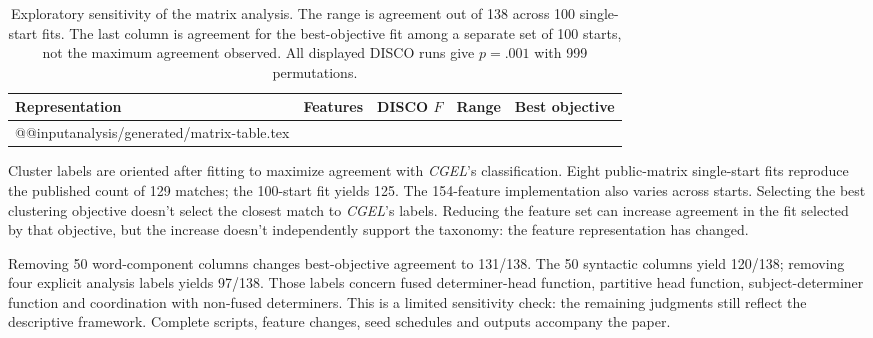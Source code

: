 \documentclass[12pt]{article}
\makeatletter
\newcommand{\tablebody}[1]{\csname @@input\endcsname #1 }
\makeatother
\begin{document}
\begin{table}[htbp]
\centering\small
\caption{Exploratory sensitivity of the matrix analysis. The range is agreement out of 138 across 100 single-start fits. The last column is agreement for the best-objective fit among a separate set of 100 starts, not the maximum agreement observed. All displayed DISCO runs give \mbox{$p=.001$} with 999 permutations.}\label{tab:matrix}
\begin{tabular}{>{\raggedright\arraybackslash}p{5.1cm}rrrr}
\toprule
Representation & Features & DISCO $F$ & Range & Best objective \\
\midrule
\tablebody{analysis/generated/matrix-table.tex}
\bottomrule
\end{tabular}
\end{table}

Cluster labels are oriented after fitting to maximize agreement with \textit{CGEL}'s classification. Eight public-matrix single-start fits reproduce the published count of 129 matches; the 100-start fit yields 125. The 154-feature implementation also varies across starts. Selecting the best clustering objective doesn't select the closest match to \textit{CGEL}'s labels. Reducing the feature set can increase agreement in the fit selected by that objective, but the increase doesn't independently support the taxonomy: the feature representation has changed.

Removing 50 word-component columns changes best-objective agreement to 131/138. The 50 syntactic columns yield 120/138; removing four explicit analysis labels yields 97/138. Those labels concern fused determiner-head function, partitive head function, subject-determiner function and coordination with non-fused determiners. This is a limited sensitivity check: the remaining judgments still reflect the descriptive framework. Complete scripts, feature changes, seed schedules and outputs accompany the paper.

\clearpage
\printbibliography
\end{document}
